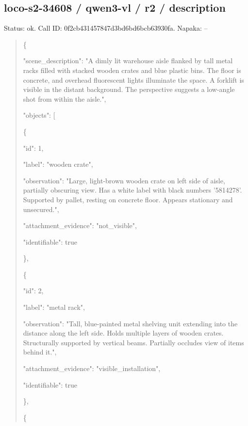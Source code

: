 \documentclass[10pt,a4paper]{article}
\begin{document}
\subsection*{loco-s2-34608 / qwen3-vl / r2 / description}
Status: ok. Call ID: 0f2cb431457847d3bd6bd6bcb63930fa. Napaka: --
\begin{quote}\footnotesize
\{\par
  "scene\_description":\allowbreak{} "A dimly lit warehouse aisle flanked by tall metal racks filled with stacked wooden crates and blue plastic bins. The floor is concrete,\allowbreak{} and overhead fluorescent lights illuminate the space. A forklift is visible in the distant background. The perspective suggests a low-angle shot from within the aisle.",\allowbreak{}\par
  "objects":\allowbreak{} [\par
    \{\par
      "id":\allowbreak{} 1,\allowbreak{}\par
      "label":\allowbreak{} "wooden crate",\allowbreak{}\par
      "observation":\allowbreak{} "Large,\allowbreak{} light-brown wooden crate on left side of aisle,\allowbreak{} partially obscuring view. Has a white label with black numbers '5814278'. Supported by pallet,\allowbreak{} resting on concrete floor. Appears stationary and unsecured.",\allowbreak{}\par
      "attachment\_evidence":\allowbreak{} "not\_visible",\allowbreak{}\par
      "identifiable":\allowbreak{} true\par
    \},\allowbreak{}\par
    \{\par
      "id":\allowbreak{} 2,\allowbreak{}\par
      "label":\allowbreak{} "metal rack",\allowbreak{}\par
      "observation":\allowbreak{} "Tall,\allowbreak{} blue-painted metal shelving unit extending into the distance along the left side. Holds multiple layers of wooden crates. Structurally supported by vertical beams. Partially occludes view of items behind it.",\allowbreak{}\par
      "attachment\_evidence":\allowbreak{} "visible\_installation",\allowbreak{}\par
      "identifiable":\allowbreak{} true\par
    \},\allowbreak{}\par
    \{\par

\end{quote}
\end{document}
